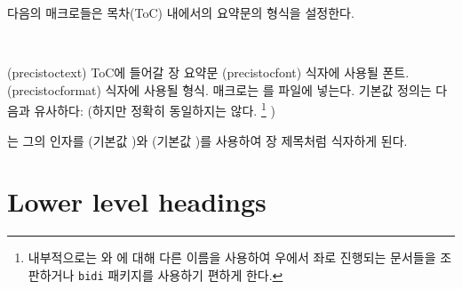 다음의 매크로들은 목차(ToC) 내에서의 요약문의 형식을 설정한다.
\begin{syntax}
\cmd{\precistoctext} \cmd{\precistocfont} \cmd{\precistocformat} \\
\end{syntax}
\glossary(precistoctext)%
  {}%
  {ToC에 들어갈 장 요약문 }
\glossary(precistocfont)%
  {}%
  { 식자에 사용될 폰트.}
\glossary(precistocformat)%
  {}%
  { 식자에 사용될 형식.}
\cmd{\chapterprecistoc} 매크로는 \cmd{\precistoctext}를
 파일에 넣는다.
기본값 정의는 다음과 유사하다:
(하지만 정확히 동일하지는 않다.%
\footnote{내부적으로는 와 에 대해 다른 이름을 사용하여
우에서 좌로 진행되는 문서들을 조판하거나 \texttt{bidi} 패키지를 사용하기 편하게 한다.}
)
\begin{lcode}
\DeclareRobustCommand{\precistoctext}[1]{%
  {\nopagebreak\leftskip \cftchapterindent\relax
    \advance\leftskip \cftchapternumwidth\relax
    \rightskip \@tocrmarg\relax
    \precistocformat\precistocfont #1\par}}
\end{lcode}
\toc{} \cmd{\precistoctext}는 그의 인자를 \cmd{\precistocfont} (기본값 \cmd{\itshape})와
\cmd{\precistocformat} (기본값 \cmd{\noindent})를 사용하여
장 제목처럼 식자하게 된다.



\section{Lower level headings}

